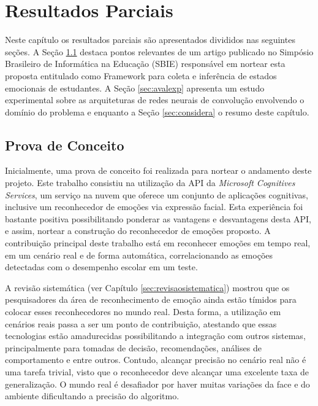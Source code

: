 \chapter{Resultados Parciais}\label{sec:resultados}
Neste capítulo os resultados parciais são apresentados divididos nas seguintes seções. A Seção \ref{sec:prova} destaca pontos relevantes de um artigo publicado no Simpósio Brasileiro de Informática na Educação (SBIE) responsável em nortear esta proposta entitulado como Framework para coleta e inferência de estados emocionais de estudantes. A Seção \ref{sec:avalexp} apresenta um estudo experimental sobre as arquiteturas de redes neurais de convolução envolvendo o domínio do problema e enquanto a Seção \ref{sec:considera} o resumo deste capítulo.   


\section{Prova de Conceito}\label{sec:prova}
Inicialmente, uma prova de conceito foi realizada para nortear o andamento deste projeto. Este trabalho \citep{cruz2017framework} consistiu na utilização da API da \textit{Microsoft Cognitives Services}, um serviço na nuvem que oferece um conjunto de aplicações cognitivas, inclusive um reconhecedor de emoções via expressão facial. Esta experiência foi bastante positiva possibilitando ponderar as vantagens e desvantagens desta API, e assim, nortear a construção do reconhecedor de emoções proposto. A contribuição principal deste trabalho está em reconhecer emoções em tempo real, em um cenário real e de forma automática, correlacionando as emoções detectadas com o desempenho escolar em um teste. 

A revisão sistemática (ver Capítulo \ref{sec:revisaosistematica}) mostrou que os pesquisadores da área de reconhecimento de emoção ainda estão tímidos para colocar esses reconhecedores no mundo real. Desta forma, a utilização em cenários reais passa a ser um ponto de contribuição, atestando que essas tecnologias estão amadurecidas possibilitando a integração com outros sistemas, principalmente para tomadas de decisão, recomendações, análises de comportamento e entre outros. Contudo, alcançar precisão no cenário real não é uma tarefa trivial, visto que o reconhecedor deve alcançar uma excelente taxa de generalização. O mundo real é desafiador por haver muitas variações da face e do ambiente dificultando a precisão do algoritmo.  


